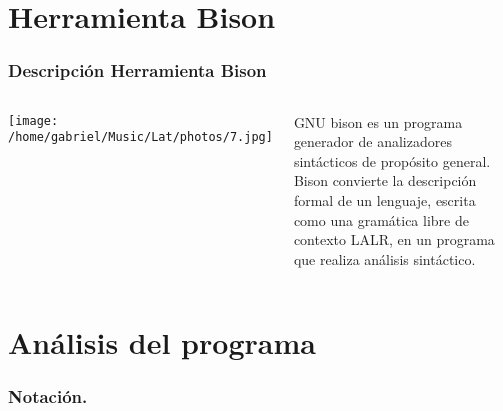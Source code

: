 \documentclass{beamer}
\begin{document}
\section{Herramienta Bison}
\begin{frame}
\frametitle{Descripción Herramienta Bison}
\begin{columns}


\begin{center}
    \texttt{[image: /home/gabriel/Music/Lat/photos/7.jpg]}
\end{center}


GNU bison es un programa generador de analizadores sintácticos de propósito general.
Bison convierte la descripción formal de un lenguaje, escrita como una gramática libre de contexto LALR, en un programa que realiza análisis sintáctico.

\end{columns}

\end{frame}




\section{Análisis del programa }

\begin{frame}
\frametitle{Notación.}

\begin{center}
    \\
    \\
    \\
    \\
    \\
    \\
\end{center}

\end{frame}
\end{document}

